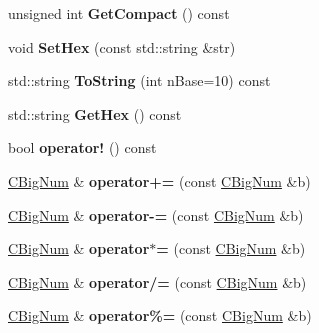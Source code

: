 \begin{DoxyCompactItemize}
\item 
\mbox{\label{class_c_big_num_aa874461cf2cfb497f2c9f20e66106d0b}} 
unsigned int {\bfseries Get\+Compact} () const
\item 
\mbox{\label{class_c_big_num_a9d4f7c42f141e45410af96e6804c54fe}} 
void {\bfseries Set\+Hex} (const std\+::string \&str)
\item 
\mbox{\label{class_c_big_num_a10da7a8b4984feee0bb0f01ef2e74da8}} 
std\+::string {\bfseries To\+String} (int n\+Base=10) const
\item 
\mbox{\label{class_c_big_num_a7b3bda0e9860ce67d99ea6e229cdd648}} 
std\+::string {\bfseries Get\+Hex} () const
\item 
\mbox{\label{class_c_big_num_a913c8446faf36d6cfebf5dc88a7fef9a}} 
bool {\bfseries operator!} () const
\item 
\mbox{\label{class_c_big_num_ac3da33626c8ab06d6a049b310c086dd5}} 
\mbox{\hyperlink{class_c_big_num}{C\+Big\+Num}} \& {\bfseries operator+=} (const \mbox{\hyperlink{class_c_big_num}{C\+Big\+Num}} \&b)
\item 
\mbox{\label{class_c_big_num_a4fe724fd22129eefc4e1f34d95505381}} 
\mbox{\hyperlink{class_c_big_num}{C\+Big\+Num}} \& {\bfseries operator-\/=} (const \mbox{\hyperlink{class_c_big_num}{C\+Big\+Num}} \&b)
\item 
\mbox{\label{class_c_big_num_aedd26ffda5c04c4765ba8e18d25d9ff0}} 
\mbox{\hyperlink{class_c_big_num}{C\+Big\+Num}} \& {\bfseries operator$\ast$=} (const \mbox{\hyperlink{class_c_big_num}{C\+Big\+Num}} \&b)
\item 
\mbox{\label{class_c_big_num_a213f7dc5a2d8212d3e7402a06ee5d5b9}} 
\mbox{\hyperlink{class_c_big_num}{C\+Big\+Num}} \& {\bfseries operator/=} (const \mbox{\hyperlink{class_c_big_num}{C\+Big\+Num}} \&b)
\item 
\mbox{\label{class_c_big_num_ac5bec8d967502c15e2dffc8600c933e6}} 
\mbox{\hyperlink{class_c_big_num}{C\+Big\+Num}} \& {\bfseries operator\%=} (const \mbox{\hyperlink{class_c_big_num}{C\+Big\+Num}} \&b)

\end{DoxyCompactItemize}
